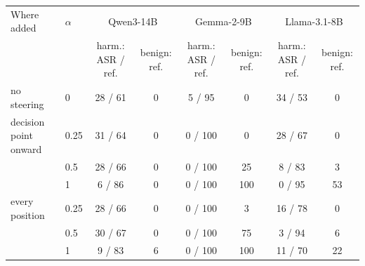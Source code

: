 \begin{tabular}{llcccccc}
\toprule
Where added & $\alpha$ & \multicolumn{2}{c}{Qwen3-14B} & \multicolumn{2}{c}{Gemma-2-9B} & \multicolumn{2}{c}{Llama-3.1-8B} \\
 & & harm.: ASR / ref. & benign: ref. & harm.: ASR / ref. & benign: ref. & harm.: ASR / ref. & benign: ref. \\
\midrule
no steering & 0 & 28 / 61 & 0 & 5 / 95 & 0 & 34 / 53 & 0 \\
decision point onward & 0.25 & 31 / 64 & 0 & 0 / 100 & 0 & 28 / 67 & 0 \\
 & 0.5 & 28 / 66 & 0 & 0 / 100 & 25 & 8 / 83 & 3 \\
 & 1 & 6 / 86 & 0 & 0 / 100 & 100 & 0 / 95 & 53 \\
every position & 0.25 & 28 / 66 & 0 & 0 / 100 & 3 & 16 / 78 & 0 \\
 & 0.5 & 30 / 67 & 0 & 0 / 100 & 75 & 3 / 94 & 6 \\
 & 1 & 9 / 83 & 6 & 0 / 100 & 100 & 11 / 70 & 22 \\
\bottomrule
\end{tabular}